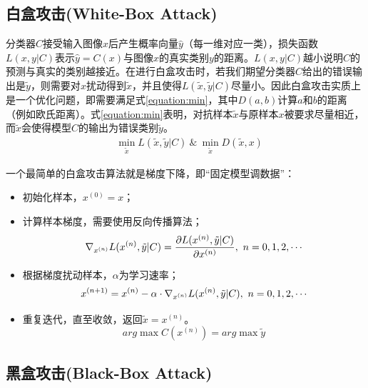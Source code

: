 \documentclass[journal, a4paper]{IEEEtran}
\begin{document}
\subsection{白盒攻击(White-Box Attack)}
\label{section:adversarial attack;subsection:white-box}

分类器$C$接受输入图像$x$后产生概率向量$\hat y$（每一维对应一类），损失函数$L(x,y|C)$表示$\hat y=C(x)$与图像$x$的真实类别$y$的距离。$L(x,y|C)$越小说明$C$的预测与真实的类别越接近。在进行白盒攻击时，若我们期望分类器$C$给出的错误输出是$\tilde y$，则需要对$x$扰动得到$\tilde x$，并且使得$L(\tilde x,\tilde y|C)$尽量小。因此白盒攻击实质上是一个优化问题，即需要满足式\ref{equation:min}，其中$D(a,b)$计算$a$和$b$的距离（例如欧氏距离）。式\ref{equation:min}表明，对抗样本$\tilde x$与原样本$x$被要求尽量相近，而$\tilde x$会使得模型$C$的输出为错误类别$\tilde y$。
\begin{align}
    &\min_{\tilde x} L(\tilde x,\tilde y|C)\ \&\ \min_{\tilde x} D(\tilde x, x) \label{equation:min}
\end{align}

一个最简单的白盒攻击算法就是梯度下降，即``固定模型调数据''：

\begin{itemize}
    \item 初始化样本，$x^{(0)}=x$；
    \item 计算样本梯度，需要使用反向传播算法；
\begin{equation}
    \nabla_{x^{(n)}}L(x^{(n)},\tilde y|C)=\frac{\partial L(x^{(n)},\tilde y|C)}{\partial x^{(n)}},\ n=0,1,2,\cdots \notag
\end{equation}
    \item 根据梯度扰动样本，$\alpha$为学习速率；
\begin{equation}
    x^{(n+1)}=x^{(n)}-\alpha\cdot\nabla_{x^{(n)}}L(x^{(n)},\tilde y|C),\ n=0,1,2,\cdots \notag
\end{equation}
    \item 重复迭代，直至收敛，返回$\tilde x=x^{(n)}$。
\begin{equation}
    arg\max C(x^{(n)})=arg\max \tilde y \label{equation:converge}
\end{equation}
\end{itemize}

\subsection{黑盒攻击(Black-Box Attack)}
\label{section:adversarial attack;subsection:black-box}
\end{document}
